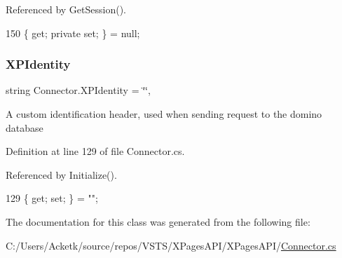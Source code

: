 Referenced by Get\+Session().


\begin{DoxyCode}
150 \{ \textcolor{keyword}{get}; \textcolor{keyword}{private} \textcolor{keyword}{set}; \} = null;
\end{DoxyCode}
\mbox{\label{class_connector_a092e3e36f92c129c07c57df9b8fb91ca}} 
\subsubsection{\texorpdfstring{X\+P\+Identity}{XPIdentity}}
{\footnotesize\ttfamily string Connector.\+X\+P\+Identity = \char`\"{}\char`\"{}\hspace{0.3cm}{\ttfamily [get]}, {\ttfamily [set]}}



A custom identification header, used when sending request to the domino database 



Definition at line 129 of file Connector.\+cs.



Referenced by Initialize().


\begin{DoxyCode}
129 \{ \textcolor{keyword}{get}; \textcolor{keyword}{set}; \} = \textcolor{stringliteral}{""};
\end{DoxyCode}


The documentation for this class was generated from the following file\+:\begin{DoxyCompactItemize}
\item 
C\+:/\+Users/\+Acketk/source/repos/\+V\+S\+T\+S/\+X\+Pages\+A\+P\+I/\+X\+Pages\+A\+P\+I/\mbox{\hyperlink{_connector_8cs}{Connector.\+cs}}\end{DoxyCompactItemize}

